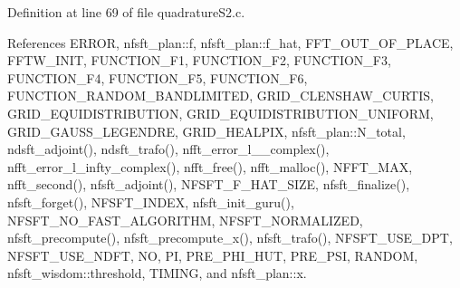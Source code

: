 Definition at line 69 of file quadratureS2.c.

References ERROR, nfsft\_\-plan::f, nfsft\_\-plan::f\_\-hat, FFT\_\-OUT\_\-OF\_\-PLACE, FFTW\_\-INIT, FUNCTION\_\-F1, FUNCTION\_\-F2, FUNCTION\_\-F3, FUNCTION\_\-F4, FUNCTION\_\-F5, FUNCTION\_\-F6, FUNCTION\_\-RANDOM\_\-BANDLIMITED, GRID\_\-CLENSHAW\_\-CURTIS, GRID\_\-EQUIDISTRIBUTION, GRID\_\-EQUIDISTRIBUTION\_\-UNIFORM, GRID\_\-GAUSS\_\-LEGENDRE, GRID\_\-HEALPIX, nfsft\_\-plan::N\_\-total, ndsft\_\-adjoint(), ndsft\_\-trafo(), nfft\_\-error\_\-l\_\_\-complex(), nfft\_\-error\_\-l\_\-infty\_\-complex(), nfft\_\-free(), nfft\_\-malloc(), NFFT\_\-MAX, nfft\_\-second(), nfsft\_\-adjoint(), NFSFT\_\-F\_\-HAT\_\-SIZE, nfsft\_\-finalize(), nfsft\_\-forget(), NFSFT\_\-INDEX, nfsft\_\-init\_\-guru(), NFSFT\_\-NO\_\-FAST\_\-ALGORITHM, NFSFT\_\-NORMALIZED, nfsft\_\-precompute(), nfsft\_\-precompute\_\-x(), nfsft\_\-trafo(), NFSFT\_\-USE\_\-DPT, NFSFT\_\-USE\_\-NDFT, NO, PI, PRE\_\-PHI\_\-HUT, PRE\_\-PSI, RANDOM, nfsft\_\-wisdom::threshold, TIMING, and nfsft\_\-plan::x.